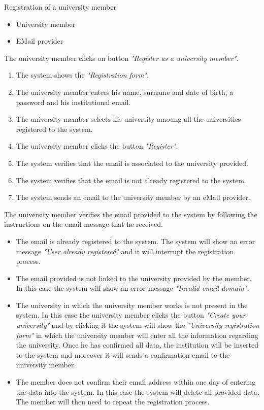 \usecase
{Registration of a university member}
{
    \begin{itemize}
        \item University member
        \item EMail provider
    \end{itemize}
}
{
    The university member clicks on button \textit{"Register as a university member"}.
}
{
    \begin{enumerate}
        \item The system shows the \textit{"Registration form"}.
        \item The university member enters his name, surname and date of birth, a password and his institutional email.
        \item The university member selects his university amoung all the universities registered to the system.
        \item The university member clicks the button \textit{"Register"}.
        \item The system verifies that the email is associated to the university provided.
        \item The system verifies that the email is not already registered to the system.
        \item The system sends an email to the university member by an eMail provider.
    \end{enumerate}
}
{
    The university member verifies the email provided to the system by following the instructions on the email message that he received.
}
{
    \begin{itemize}
        \item The email is already registered to the system. The system will show an error message \textit{"User already registered"} and it will interrupt the registration process.
        \item The email provided is not linked to the university provided by the member. In this case the system will show an error message \textit{"Invalid email domain"}.
        \item The university in which the university member works is not present in the system. In this case the university member clicks the button \textit{"Create your university"} and by clicking it the system will show the \textit{"University registration form"} in which the university member will enter all the information regarding the university. Once he has confirmed all data, the institution will be inserted to the system and moreover it will sends a confirmation email to the university member.
        \item The member does not confirm their email address within one day of entering the data into the system. In this case the system will delete all provided data. The member will then need to repeat the registration process.
    \end{itemize}
}
{

}

